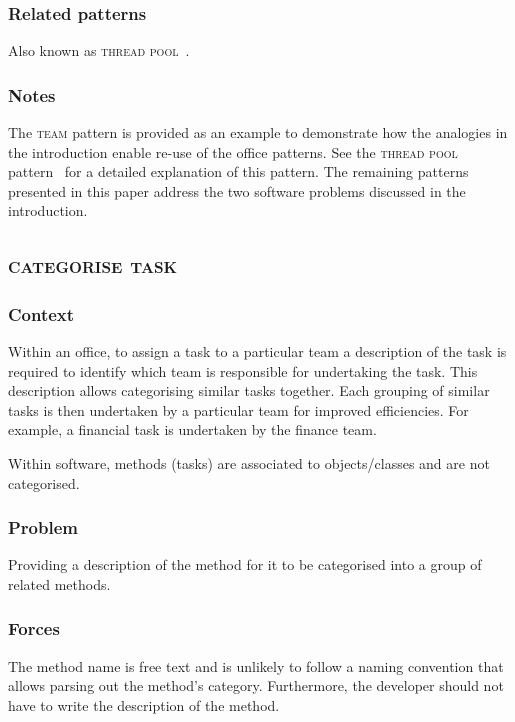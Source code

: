 \documentclass[prodmode]{style/acmlarge}
\begin{document}
\subsubsection*{Related patterns} Also known as \textsc{thread
pool}~\cite{thread-per-request}.

\subsubsection*{Notes} The \textsc{team} pattern is provided as an example to
demonstrate how the analogies in the introduction enable re-use of the office
patterns. See the \textsc{thread pool} pattern~\cite{thread-per-request} for a
detailed explanation of this pattern.  The remaining patterns presented in this
paper address the two software problems discussed in the introduction.



\subsection{\textsc{\textbf{categorise task}}}

\subsubsection*{Context} Within an office, to assign a task to a particular team
a description of the task is required to identify which team is responsible for
undertaking the task.  This description allows categorising similar tasks
together.  Each grouping of similar tasks is then undertaken by a particular
team for improved efficiencies.  For example, a financial task is undertaken by
the finance team.

Within software, methods (tasks) are associated to objects/classes and are not
categorised.

\subsubsection*{\textbf{Problem}} Providing a description of the method for it to be
categorised into a group of related methods.

\subsubsection*{Forces} The method name is free text and is unlikely to follow a
naming convention that allows parsing out the method's category.  Furthermore, the
developer should not have to write the description of the method.
\end{document}
